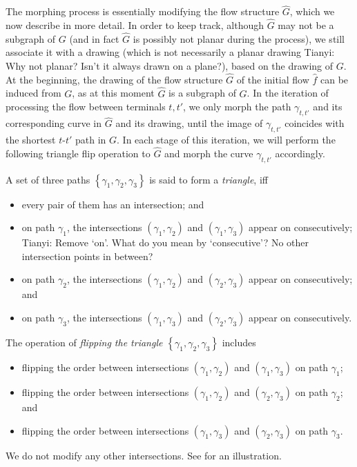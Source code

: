 \documentclass[11pt]{article}
\newcommand{\tianyi}[1]{{\color{purple} Tianyi: #1}}
\newcommand{\set}[1]{\left\{ #1 \right\}}
\begin{document}
The morphing process is essentially  modifying the flow structure $\hat G$, which we now describe in more detail.
In order to keep track, although $\hat G$ may not be a subgraph of $G$ (and in fact $\hat G$ is possibly not planar during the process), we still associate it with a drawing (which is not necessarily a planar drawing \tianyi{Why not planar? Isn't it always drawn on a plane?}), based on the drawing of $G$.
At the beginning, the drawing of the flow structure $\hat G$ of the initial flow $\hat f$ can be induced from $G$, as at this moment $\hat G$ is a subgraph of $G$.
In the iteration of processing the flow between terminals $t,t'$, we only morph the path $\gamma_{t,t'}$ and its corresponding curve in $\hat G$ and its drawing, until the image of $\gamma_{t,t'}$ coincides with the shortest $t$-$t'$ path in $G$. 
In each stage of this iteration, we will perform the following triangle flip operation to $\hat G$ and morph the curve $\gamma_{t,t'}$ accordingly.
\fi

\iffalse
A set of three paths $\set{\gamma_{1},\gamma_{2},\gamma_{3}}$ is said to form a \emph{triangle}, iff
\begin{itemize}
    \item every pair of them has an intersection; and
    \item on path $\gamma_{1}$, the intersections $(\gamma_{1},\gamma_{2})$ and $(\gamma_{1},\gamma_{3})$ appear on consecutively; \tianyi{Remove `on'. What do you mean by `consecutive'? No other intersection points in between?}
    \item on path $\gamma_{2}$, the intersections $(\gamma_{1},\gamma_{2})$ and $(\gamma_{2},\gamma_{3})$ appear on consecutively; and
    \item on path $\gamma_{3}$, the intersections $(\gamma_{1},\gamma_{3})$ and $(\gamma_{2},\gamma_{3})$ appear on consecutively.
\end{itemize}
The operation of \emph{flipping the triangle $\set{\gamma_{1},\gamma_{2},\gamma_{3}}$} includes 
\begin{itemize}
    \item flipping the order between intersections $(\gamma_{1},\gamma_{2})$ and $(\gamma_{1},\gamma_{3})$ on path $\gamma_{1}$; 
    \item flipping the order between intersections $(\gamma_{1},\gamma_{2})$ and $(\gamma_{2},\gamma_{3})$ on path $\gamma_{2}$; and
    \item flipping the order between intersections $(\gamma_{1},\gamma_{3})$ and $(\gamma_{2},\gamma_{3})$ on path $\gamma_{3}$.
\end{itemize}
We do not modify any other intersections. See  for an illustration.
\end{document}
